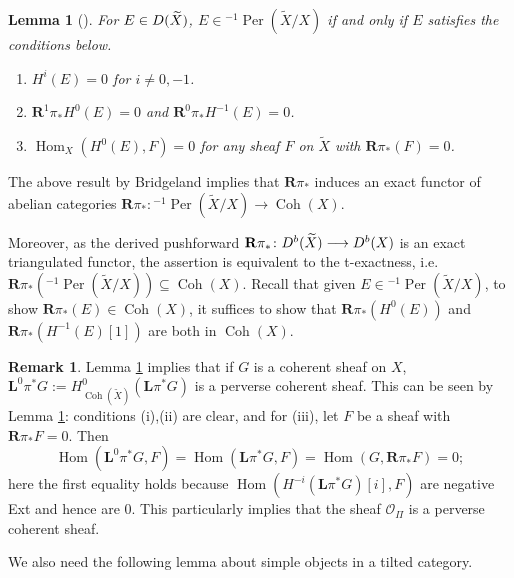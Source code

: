 \documentclass[12pt]{amsart}
\newtheorem{lemma}[theorem]{Lemma}
\theoremstyle{definition}
\newtheorem{remark}[theorem]{Remark}
\DeclareMathOperator{\Hom}{Hom}
\DeclareMathOperator{\Coh}{Coh}
\DeclareMathOperator{\Per}{Per}
\begin{document}
\begin{lemma}[{\normalfont\cite[Lemma 3.2]{Bri02}}]\label{Bri02}
For $E \in \rm{D}(\widetilde{X})$, $E \in {^{-1}\Per(\widetilde{X}/X)}$ if and only if $E$ satisfies the conditions below.
\begin{enumerate}
    \item $H^i(E) = 0$ for $i \neq 0,-1$.
    \item $\mathbf{R}^1\pi_\ast H^0(E) = 0$ and $\mathbf{R}^0\pi_\ast H^{-1}(E) = 0$.
    \item $\Hom_X(H^0(E),F)=0$ for any sheaf $F$ on $\widetilde{X}$ with $\mathbf{R}\pi_\ast(F)=0$.
\end{enumerate}
\end{lemma}

The above result by Bridgeland implies that $\mathbf{R}\pi_\ast$  
induces an exact functor of abelian categories $\mathbf{R}\pi_\ast \colon {^{-1}\Per(\widetilde{X}/X)} \longrightarrow \Coh(X)$.

Moreover, as the derived pushforward $\mathbf{R}\pi_\ast \colon {\rm D}^b(\widetilde{X}) \longrightarrow {\rm D}^b(X) $ is an exact triangulated functor, the assertion is equivalent to the t-exactness, i.e. $\mathbf{R}\pi_\ast( {^{-1}\Per(\widetilde{X}/X)}) \subseteq \Coh(X)$.
Recall that given $E \in {^{-1}\Per(\widetilde{X}/X)}$, to show $\mathbf{R}\pi_\ast(E) \in \Coh(X)$, it suffices to show that $\mathbf{R}\pi_\ast(H^0(E))$ and $\mathbf{R}\pi_\ast(H^{-1}(E)[1])$ are both in $\Coh(X)$.

\begin{remark}
Lemma \ref{Bri02} implies that if $G$ is a coherent sheaf on $X$,
$\mathbf{L}^0\pi^\ast G:= H^0_{\Coh(\widetilde{X})}(\mathbf{L}\pi^\ast G)$ is a perverse coherent sheaf.
This can be seen by Lemma \ref{Bri02}: 
conditions (i),(ii) are clear, and for (iii), let $F$ be a sheaf with $\mathbf{R}\pi_\ast F=0$. 
Then 
\[\Hom(\mathbf{L}^0\pi^\ast G,F) = \Hom(\mathbf{L}\pi^\ast G,F) = \Hom(G, \mathbf{R}\pi_\ast F) = 0;\]
here the first equality holds because $\Hom(H^{-i}(\mathbf{L}\pi^\ast G)[i],F)$ are negative Ext and hence are $0$.
This particularly implies that the sheaf $\mathcal{O}_{\Pi}$ is a perverse coherent sheaf.
\end{remark}

We also need the following lemma about simple objects in a tilted category.
\end{document}
